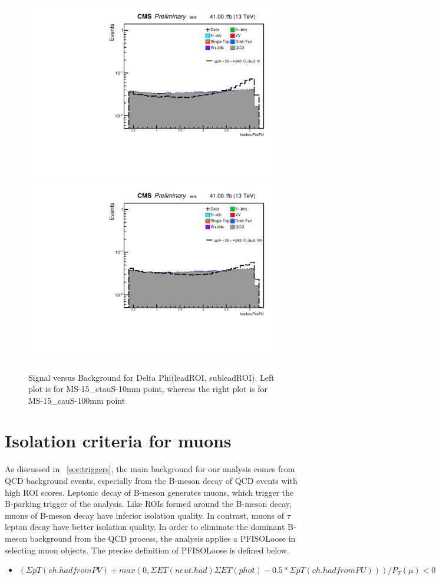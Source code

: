 

 \begin{figure}[h!]
   \caption{Signal versus Background for Delta Phi(leadROI, subleadROI). Left plot is for MS-15\_ctauS-10mm point, whereas the right plot is for MS-15\_cauS-100mm point}
   \label{fig:leadexcPosPhi}
   \centering
   \includegraphics[width=0.40\linewidth]{figs/AnalysisNoteplot_MS-15_ctauS-10_leadexcPosPhi.pdf}
   \includegraphics[width=0.40\linewidth]{figs/AnalysisNoteplot_MS-15_ctauS-100_leadexcPosPhi.pdf}
 \end{figure}

\section{Isolation criteria for muons}\label{ref:muISO}
As discussed in ~\ref{sec:triggers}, the main background for our analysis comes from QCD background events, especially from the B-meson decay of QCD events with high ROI scores.
Leptonic decay of B-meson generates muons, which trigger the B-parking trigger of the analysis.
Like ROIs formed around the B-meson decay, muons of B-meson decay have inferior isolation quality.
In contrast, muons of $\tau$ lepton decay have better isolation quality.
In order to eliminate the dominant B-meson background from the QCD process, the analysis applies a PFISOLoose in selecting muon objects.
The precise definition of PFISOLoose is defined below.
\begin{itemize}
  \item $(\Sigma pT(ch.had from PV)+max(0,\Sigma ET(neut.had) \Sigma ET (phot)-0.5* \Sigma pT(ch.had from PU)))/P_{T}(\mu)<0.25$
\end{itemize}

